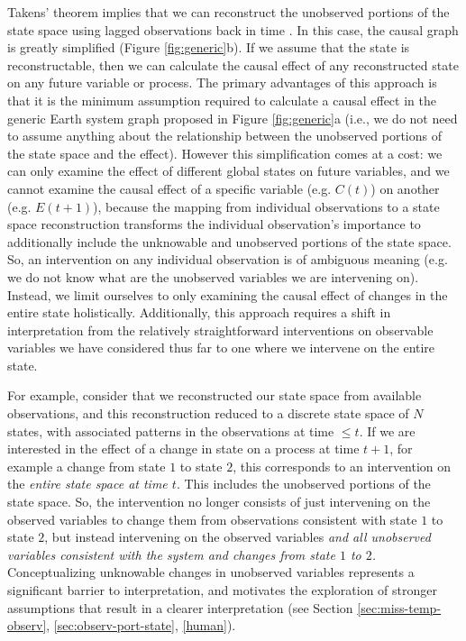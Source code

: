 \documentclass[12pt]{article}
\begin{document}
Takens' theorem implies that we can reconstruct the unobserved
portions of the state space using lagged observations back in time
\citep{takens1981detecting,deyle2011generalized,Sugihara496}. In this
case, the causal graph is greatly simplified (Figure
\ref{fig:generic}b). If we assume that the state is reconstructable,
then we can calculate the causal effect of any reconstructed state on
any future variable or process. The primary advantages of this
approach is that it is the minimum assumption required to calculate a
causal effect in the generic Earth system graph proposed in Figure
\ref{fig:generic}a (i.e., we do not need to assume anything about the
relationship between the unobserved portions of the state space and
the effect). However this simplification comes at a cost: we can only
examine the effect of different global states on future variables, and
we cannot examine the causal effect of a specific variable
(e.g. $C(t)$) on another (e.g. $E(t+1)$), because the mapping from
individual observations to a state space reconstruction transforms the
individual observation's importance to additionally include the
unknowable and unobserved portions of the state space. So, an
intervention on any individual observation is of ambiguous meaning
(e.g. we do not know what are the unobserved variables we are
intervening on). Instead, we limit ourselves to only examining the
causal effect of changes in the entire state
holistically. Additionally, this approach requires a shift in
interpretation from the relatively straightforward interventions on
observable variables we have considered thus far to one where we
intervene on the entire state.

For example, consider that we reconstructed our state space from
available observations, and this reconstruction reduced to a discrete
state space of $N$ states, with associated patterns in the
observations at time $\leq t$. If we are interested in the effect of a
change in state on a process at time $t+1$, for example a change from
state $1$ to state $2$, this corresponds to an intervention on the
\textit{entire state space at time $t$}. This includes the unobserved
portions of the state space. So, the intervention no longer consists
of just intervening on the observed variables to change them from
observations consistent with state $1$ to state $2$, but instead
intervening on the observed variables \emph{and all unobserved
  variables consistent with the system and changes from state $1$ to
  $2$.}  Conceptualizing unknowable changes in unobserved variables
represents a significant barrier to interpretation, and motivates the
exploration of stronger assumptions that result in a clearer
interpretation (see Section \ref{sec:miss-temp-observ},
\ref{sec:observ-port-state}, \ref{human}).
\end{document}
